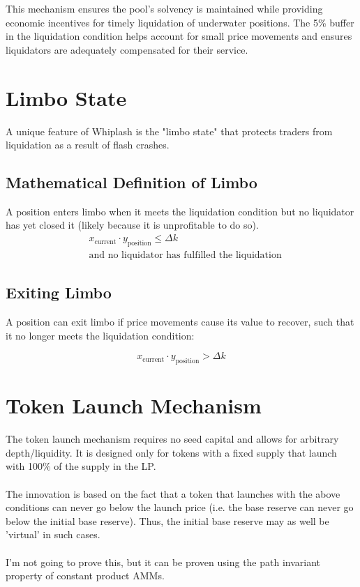 \documentclass[11pt]{article}
\begin{document}
This mechanism ensures the pool's solvency is maintained while providing economic incentives for timely liquidation of underwater positions. The 5\% buffer in the liquidation condition helps account for small price movements and ensures liquidators are adequately compensated for their service.

\section{Limbo State}

A unique feature of Whiplash is the "limbo state" that protects traders from liquidation as a result of flash crashes.

\subsection{Mathematical Definition of Limbo}

A position enters limbo when it meets the liquidation condition but no liquidator has yet closed it (likely because it is unprofitable to do so).
\begin{equation}
\begin{aligned}
&x_{\text{current}} \cdot y_{\text{position}} \le \Delta k \\
&\text{and no liquidator has fulfilled the liquidation}
\end{aligned}
\end{equation}

\subsection{Exiting Limbo}

A position can exit limbo if price movements cause its value to recover, such that it no longer meets the liquidation condition:

\begin{equation}
x_{\text{current}} \cdot y_{\text{position}} > \Delta k
\end{equation}

\section{Token Launch Mechanism}

The token launch mechanism requires no seed capital and allows for arbitrary depth/liquidity. It is designed only for tokens with a fixed supply that launch with 100\% of the supply in the LP.
\\\\The innovation is based on the fact that a token that launches with the above conditions can never go below the launch price (i.e. the base reserve can never go below the initial base reserve). Thus, the initial base reserve may as well be 'virtual' in such cases.
\\\\I'm not going to prove this, but it can be proven using the path invariant property of constant product AMMs.
        
\end{document}
